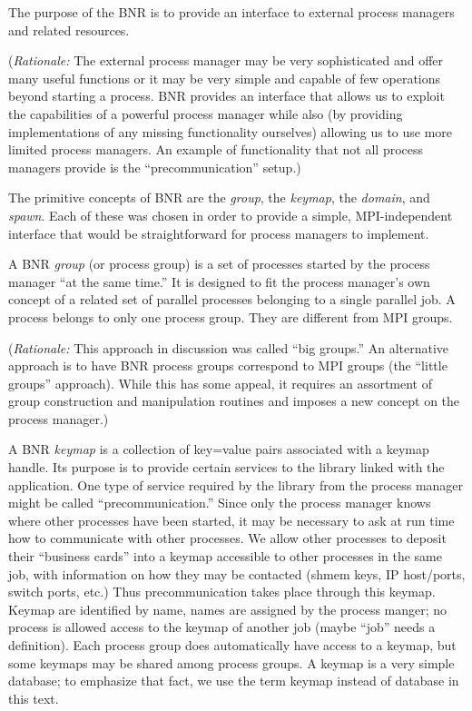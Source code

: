 \documentclass{article}
\begin{document}
The purpose of the BNR is to provide an interface to external process
managers and related resources.  

({\em Rationale:\/} The external process manager may be
very sophisticated and offer many useful functions or it may be very
simple and capable of few operations beyond starting a process.
BNR provides an interface that allows us to exploit the
capabilities of a powerful process manager while also (by providing
implementations of any missing functionality ourselves) allowing us to
use more limited process managers.  An example of functionality that
not all process managers provide is the ``precommunication'' setup.)

The primitive concepts of BNR are the {\em group}, the {\em keymap}, 
the {\em domain}, and {\em spawn}.  Each of these was chosen in 
order to provide a simple, MPI-independent interface that would be 
straightforward for process managers to implement.

A BNR {\em group\/} (or process group) is a set of processes started by the
process manager ``at the same time.''  It is designed to fit the process
manager's own concept of a related set of parallel processes belonging to a
single parallel job.  A process belongs to only one process group.  They are 
different from MPI groups.

({\em Rationale:\/}  This approach in discussion was called ``big groups.''
An alternative approach is to have BNR process groups correspond to MPI groups
(the ``little groups'' approach).  While this has some appeal, it requires an
assortment of group construction and manipulation routines and imposes a new
concept on the process manager.)

A BNR {\em keymap\/} is a collection of key=value pairs associated
with a keymap handle.  Its purpose is to provide certain
services to the library linked with the application.  One type of
service required by the library from the process manager might be
called ``precommunication.''  Since only the process manager knows
where other processes have been started, it may be necessary to ask at
run time how to communicate with other processes.  We allow other
processes to deposit their ``business cards'' into a keymap accessible
to other processes in the same job, with information on how they may
be contacted (shmem keys, IP host/ports, switch ports, etc.)  Thus
precommunication takes place through this keymap.  Keymap are
identified by name, names are assigned by the process manger; no
process is allowed access to the keymap of another job (maybe ``job''
needs a definition).  Each process group does automatically have
access to a keymap, but some keymaps may be shared among process
groups.  A keymap is a very simple database; to emphasize that fact,
we use the term keymap instead of database in this text.
\end{document}
